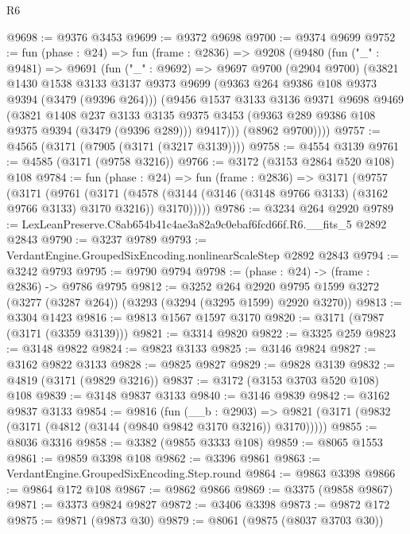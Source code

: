 \begin{lexlean}{R6}
\begin{coremodule}
@9698 := @9376 @3453
@9699 := @9372 @9698
@9700 := @9374 @9699
@9752 := fun (phase : @24) =>
  fun (frame : @2836) =>
  @9208
    (@9480
      (fun ("_" : @9481) =>
      @9691
        (fun ("_" : @9692) =>
        @9697
          @9700
          (@2904 @9700)
          (@3821
            @1430
            @1538
            @3133
            @3137
            @9373
            @9699
            (@9363 @264 @9386 @108 @9373 @9394 (@3479 (@9396 @264)))
            (@9456
              @1537
              @3133
              @3136
              @9371
              @9698
              @9469
              (@3821
                @1408
                @237
                @3133
                @3135
                @9375
                @3453
                (@9363 @289 @9386 @108 @9375 @9394 (@3479 (@9396 @289)))
                @9417)))
          (@8962 @9700))))
@9757 := @4565 (@3171 (@7905 (@3171 (@3217 @3139))))
@9758 := @4554 @3139
@9761 := @4585 (@3171 (@9758 @3216))
@9766 := @3172 (@3153 @2864 @520 @108) @108
@9784 := fun (phase : @24) =>
  fun (frame : @2836) =>
  @3171
    (@9757
      (@3171
        (@9761
          (@3171
            (@4578 (@3144 (@3146 (@3148 @9766 @3133) (@3162 @9766 @3133) @3170 @3216)) @3170)))))
@9786 := @3234 @264 @2920
@9789 := LexLeanPreserve.C8ab654b41c4ae3a82a9c0ebaf6fcd66f.R6.__fits_5 @2892 @2843
@9790 := @3237 @9789
@9793 := VerdantEngine.GroupedSixEncoding.nonlinearScaleStep @2892 @2843
@9794 := @3242 @9793
@9795 := @9790 @9794
@9798 := (phase : @24) -> (frame : @2836) -> @9786 @9795
@9812 := @3252
    @264
    @2920
    @9795
    @1599
    @3272
    (@3277 (@3287 @264))
    (@3293 (@3294 (@3295 @1599) @2920 @3270))
@9813 := @3304 @1423
@9816 := @9813 @1567 @1597 @3170
@9820 := @3171 (@7987 (@3171 (@3359 @3139)))
@9821 := @3314 @9820
@9822 := @3325 @259
@9823 := @3148 @9822
@9824 := @9823 @3133
@9825 := @3146 @9824
@9827 := @3162 @9822 @3133
@9828 := @9825 @9827
@9829 := @9828 @3139
@9832 := @4819 (@3171 (@9829 @3216))
@9837 := @3172 (@3153 @3703 @520 @108) @108
@9839 := @3148 @9837 @3133
@9840 := @3146 @9839
@9842 := @3162 @9837 @3133
@9854 := @9816
    (fun (__b : @2903) =>
    @9821 (@3171 (@9832 (@3171 (@4812 (@3144 (@9840 @9842 @3170 @3216)) @3170)))))
@9855 := @8036 @3316
@9858 := @3382 (@9855 @3333 @108)
@9859 := @8065 @1553
@9861 := @9859 @3398 @108
@9862 := @3396 @9861
@9863 := VerdantEngine.GroupedSixEncoding.Step.round
@9864 := @9863 @3398
@9866 := @9864 @172 @108
@9867 := @9862 @9866
@9869 := @3375 (@9858 @9867)
@9871 := @3373 @9824 @9827
@9872 := @3406 @3398
@9873 := @9872 @172
@9875 := @9871 (@9873 @30)
@9879 := @8061 (@9875 (@8037 @3703 @30))

\end{coremodule}
\end{lexlean}
